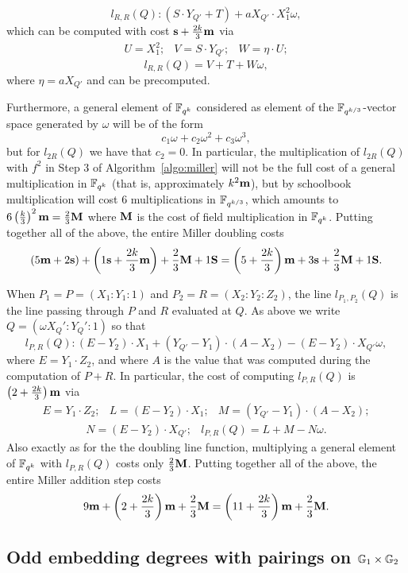 \[l_{R,R}(Q): (S \cdot Y_{Q'} + T) + a X_{Q'} \cdot X_1^2 \omega,\]
which can be computed with cost $\textbf{s} + \frac{2k}{3}\textbf{m}$ via
\[\begin{array}{ccc}
U = X_1^2; & V = S \cdot Y_{Q'}; & W = \eta \cdot U;
\end{array}\]
\[l_{R,R}(Q)= V+T + W\omega,\]
where $\eta = aX_{Q'}$ and can be precomputed.

Furthermore, a general element of $\mathbb{F}_{q^k}$ considered as element of the $\mathbb{F}_{q^{k/3}}$-vector space generated
by $\omega$ will be of the form 
\[c_1 \omega + c_2 \omega^2 + c_3 \omega^3,\]
but for $l_{2R}(Q)$ we have that $c_2 = 0$. In particular, the multiplication of $l_{2R}(Q)$ with $f^2$ in
Step 3 of Algorithm~\ref{algo:miller} will not be the full cost of a general multiplication in $\mathbb{F}_{q^k}$ (that
is, approximately $k^2\textbf{m}$), but by schoolbook multiplication will cost 6 multiplications in $\mathbb{F}_{q^{k/3}}$, which
amounts to $6 \left(\frac{k}{3}\right)^2 \textbf{m} = \frac{2}{3} \textbf{M}$
where $\textbf{M}$ is the cost of field multiplication in $\mathbb{F}_{q^k}$.
Putting together all of the above, the entire Miller doubling costs
\[(5\textbf{m} + 2\textbf{s}) + \left(1\textbf{s} + \frac{2k}{3}\textbf{m}\right) + \frac{2}{3}\textbf{M}  + 1\textbf{S} 
= \left( 5 + \frac{2k}{3}\right)\textbf{m} + 3\textbf{s} + \frac{2}{3}\textbf{M} + 1\textbf{S}.\]

When $P_1  = P = (X_1:Y_1:1)$ and $P_2 = R = (X_2:Y_2:Z_2)$, 
the line $l_{P_1,P_2}(Q)$ is the line passing through $P$ and $R$ evaluated at $Q$.
As above we write $Q = (\omega X_Q':Y_Q':1)$ so that
$$l_{P,R}(Q): (E - Y_2) \cdot X_1 + (Y_{Q'} - Y_1) \cdot (A - X_2) - (E - Y_2) \cdot X_{Q'}\omega,  $$
where $E = Y_1 \cdot Z_2$, and where $A$ is the value that was computed during the computation of $P+R$.
In particular, the cost of computing $l_{P,R}(Q)$ is $\left(2 + \frac{2k}{3}\right)\textbf{m}$ via
\[\begin{array}{ccc}
E = Y_1 \cdot Z_2; & L = (E-Y_2)\cdot X_1; 
& M = (Y_{Q'} - Y_1) \cdot (A - X_2); 
\end{array}\]
\[\begin{array}{cc}
N = (E - Y_2) \cdot X_{Q'}; &
l_{P,R}(Q) = L + M - N\omega.
\end{array}\]
Also exactly as for the the doubling line function, multiplying a general element of $\mathbb{F}_{q^k}$ with $l_{P,R}(Q)$ costs only
$\frac{2}{3}\textbf{M}$.
Putting together all of the above, the entire Miller addition step costs
\[9\textbf{m} + \left(2 + \frac{2k}{3}\right)\textbf{m} + \frac{2}{3}\textbf{M} 
= \left(11 + \frac{2k}{3}\right)\textbf{m} + \frac{2}{3}\textbf{M}.\]

\subsection{Odd embedding degrees with pairings on $\mathbb{G}_{1} \times \mathbb{G}_{2}$}

